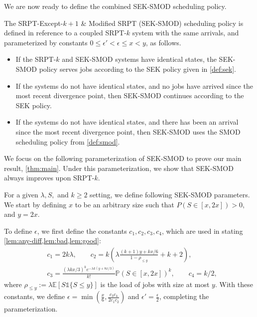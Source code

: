\documentclass[acmsmall]{acmart}
\newcommand{\ind}[1]{\mathds{1}\{#1\}}
\newcommand{\E}[1]{\mathbb{E}[#1]}
\renewcommand{\P}[1]{\mathbb{P}(#1)}
\begin{document}
We are now ready to define the combined SEK-SMOD scheduling policy.

\begin{definition}
    \label{def:sek-smod}
    The SRPT-Except-$k+1$ \& Modified SRPT (SEK-SMOD) scheduling policy is defined in reference to a coupled SRPT-$k$ system with the same arrivals,
    and parameterized by constants $0 \le \epsilon' < \epsilon \le x < y$, as follows.

    \begin{itemize}
        \item If the SRPT-$k$ and SEK-SMOD systems have identical states, the SEK-SMOD policy serves jobs according to the SEK policy given in \cref{def:sek}.

        \item If the systems do not have identical states, and no jobs have arrived since the most recent divergence point, then SEK-SMOD continues according to the SEK policy.

        \item If the systems do not have identical states, and there has been an arrival since the most recent divergence point, then SEK-SMOD uses the SMOD scheduling policy from \cref{def:smod}.
    \end{itemize}
\end{definition}

We focus on the following parameterization of SEK-SMOD to prove our main result, \cref{thm:main}. Under this parameterization, we show that SEK-SMOD always improves upon SRPT-$k$.%
\begin{definition}
    \label{def:parameter}
    For a given $\lambda, S,$ and $k \ge 2$ setting, we define following SEK-SMOD parameters. We start by defining $x$ to be an arbitrary size such that $P(S \in [x, 2x]) > 0$, and $y = 2x$.
    
    To define $\epsilon$,
    we first define the constants $c_1, c_2, c_3, c_4$, which are used in stating \cref{lem:any-diff,lem:bad,lem:good}:
    \begin{align*}
        & c_1 = 2k\lambda, \qquad c_2 = k \left(\lambda \frac{(k+1)y + kx/6}{1-\rho_{\le y}} + k+2\right), \\
        & c_3 = \frac{(\lambda kx/3)^k e^{-\lambda k(y+8x/3)}}{k!} \P{S \in [x, 2x]}^k, \qquad
        c_4 = k/2,
    \end{align*}
    where $\rho_{\le y}:=\lambda \E{S\ind{S\leq y}}$ is the load of jobs with size at most $y$. 
    With these constants, we define $\epsilon = \min(\frac{x}{6}, \frac{c_3 c_4}{2 c_1 c_2})$ and $\epsilon' = \frac{\epsilon}{2}$, completing the parameterization.
\end{definition}
\end{document}
